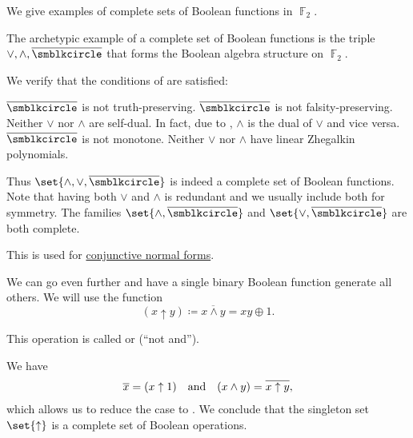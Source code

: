 \begin{example}\label{ex:posts_completeness_theorem}
  We give examples of complete sets of Boolean functions in \( \BbbF_2 \).

  \begin{thmenum}
     The archetypic example of a complete set of Boolean functions is the triple \( \vee, \wedge, \overline{\placeholder} \) that forms the Boolean algebra structure on \( \BbbF_2 \).

    We verify that the conditions of  are satisfied:
    \begin{refenum}
       \( \overline{\placeholder} \) is not truth-preserving.
       \( \overline{\placeholder} \) is not falsity-preserving.
       Neither \( \vee \) nor \( \wedge \) are self-dual. In fact, due to , \( \wedge \) is the dual of \( \vee \) and vice versa.
       \( \overline{\placeholder} \) is not monotone.
       Neither \( \vee \) nor \( \wedge \) have linear Zhegalkin polynomials.
    \end{refenum}

    Thus \( \set{ \wedge, \vee, \overline{\placeholder} } \) is indeed a complete set of Boolean functions. Note that having both \( \vee \) and \( \wedge \) is redundant and we usually include both for symmetry. The families \( \set{ \wedge, \overline{\placeholder} } \) and \( \set{ \vee, \overline{\placeholder} } \) are both complete.

    This is used for \hyperref[alg:conjunctive_normal_form_reduction]{conjunctive normal forms}.

     We can go even further and have a single binary Boolean function generate all others. We will use the function
    \begin{equation}\label{eq:ex:posts_completeness_theorem/nand}
      (x \uparrow y) \coloneqq \overline{x \wedge y} = xy \oplus 1.
    \end{equation}

    This operation is called  or  (\enquote{not and}).

    We have
    \begin{equation*}
      \begin{array}{ccc}
        \overline{x} = (x \uparrow 1)
        &
        \T{and}
        &
        (x \wedge y) = \overline{x \uparrow y},
      \end{array}
    \end{equation*}
    which allows us to reduce the case to . We conclude that the singleton set \( \set{ \uparrow } \) is a complete set of Boolean operations.


\end{thmenum}
\end{example}
